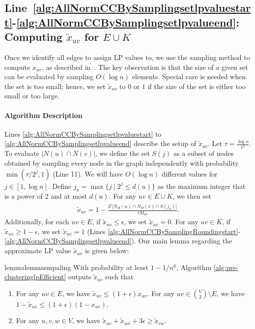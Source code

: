 \documentclass[11pt]{article}
\begin{document}
\begin{CJK*}{UTF8}{gbsn}
\subsection{Line~\ref{alg:AllNormCCBySamplingsetlpvaluestart}-\ref{alg:AllNormCCBySamplingsetlpvalueend}: Computing $\tilde{x}_{uv}$ for $E \cup K$}

Once we identify all edges to assign LP values to, we use the sampling method to compute $x_{uv}$, as described in~\cite{davies2023fast}. The key observation is that the size of a given set can be evaluated by sampling $O(\log n)$ elements. Special care is needed when the set is too small; hence, we set $\tilde{x}_{uv}$ to $0$ or $1$ if the size of the set is either too small or too large.

\paragraph{Algorithm Description}
Lines \ref{alg:AllNormCCBySamplingsetlpvaluestart} to \ref{alg:AllNormCCBySamplingsetlpvalueend} describe the setup of $\tilde{x}_{uv}$. Let $\tau = \frac{\log n}{\epsilon^2}$. To evaluate $|N(u) \cap N(v)|$, we define the set $S(j)$ as a subset of nodes obtained by sampling every node in the graph independently with probability $\min(\tau / 2^j, 1)$ (Line 11). We will have $O(\log n)$ different values for $j \in [1, \log n]$. Define $j_u = \max\{j \mid 2^j \leq d(u)\}$ as the maximum integer that is a power of 2 and at most $d(u)$. For any $uv \in E \cup K$, we then set 
\begin{align*}
    \tilde{x}_{uv} = 1 - \frac{ 2^j |N_H(u) \cap N_H(v) \cap S(j_u)|}{ \tau M_{uv}}.
\end{align*}
Additionally, for each $uv \in E$, if $\tilde{x}_{uv} \leq \epsilon$, we set $\tilde{x}_{uv} = 0$. For any $uv \in K$, if $\tilde{x}_{uv} \geq 1 - \epsilon$, we set $\tilde{x}_{uv} = 1$ (Lines \ref{alg:AllNormCCBySamplingRoundingstart}-\ref{alg:AllNormCCBySamplingsetlpvalueend}). Our main lemma regarding the approximate LP value $\tilde{x}_{uv}$ is given below:

\begin{restatable}{lemma}{lemmasmpaling}
\label{lemma:samplingfinalvalue}
With probability at least $1 - 1 / n^6$, Algorithm \ref{alg:pre-clusteringlpEfficient} outputs $\tilde{x}_{uv}$ such that
\begin{enumerate}[label=(\ref{lemma:samplingfinalvalue}\alph*)]\item For any $uv \in E$, we have $\tilde{x}_{uv} \leq (1 + \epsilon) x_{uv}$. For any $uv \in {V \choose 2} \setminus E$, we have $1 - \tilde{x}_{uv} \leq (1 + \epsilon)(1 - x_{uv})$.
    \label{lemma:samplingfinalvaluelpvalue}
    \item For any $u, v, w \in V$, we have $\tilde{x}_{uv} + \tilde{x}_{uw} + 3\epsilon \geq \tilde{x}_{vw}$.
    \label{lemma:samplingfinalvaluetriangle}
\end{enumerate}
\end{restatable}


\end{CJK*}
\end{document}
